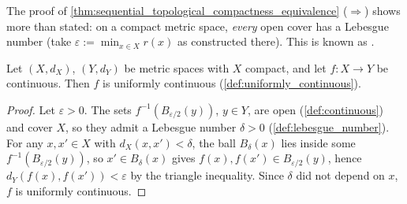 \begin{remark}
The proof of \cref{thm:sequential_topological_compactness_equivalence} ($\Rightarrow$) shows
more than stated: on a compact metric space, \emph{every} open cover has a Lebesgue number (take
$\varepsilon := \min_{x\in X} r(x)$ as constructed there). This is known as  .
\end{remark}

\begin{proposition}
\label{prop:compact_implies_uniformly_continuous}
Let $(X,d_X)$, $(Y,d_Y)$ be metric spaces with $X$ compact, and let $f : X \to Y$ be continuous.
Then $f$ is uniformly continuous (\cref{def:uniformly_continuous}).
\end{proposition}

\begin{proof}
Let $\varepsilon > 0$. The sets $f^{-1}(B_{\varepsilon/2}(y))$, $y \in Y$, are open
(\cref{def:continuous}) and cover $X$, so they admit a Lebesgue number $\delta > 0$
(\cref{def:lebesgue_number}). For any $x,x' \in X$ with $d_X(x,x') < \delta$, the ball
$B_\delta(x)$ lies inside some $f^{-1}(B_{\varepsilon/2}(y))$, so $x' \in B_\delta(x)$ gives
$f(x),f(x') \in B_{\varepsilon/2}(y)$, hence $d_Y(f(x),f(x')) < \varepsilon$ by the triangle
inequality. Since $\delta$ did not depend on $x$, $f$ is uniformly continuous.
\end{proof}

